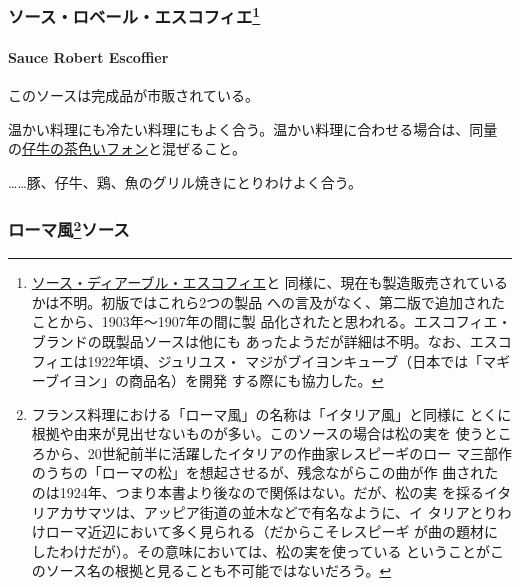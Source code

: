 \begin{recette}
{\subsubsection[ソース・ロベール・エスコフィエ]{\texorpdfstring{ソース・ロベール・エスコフィエ\footnote{\protect\hyperlink{sauce-diable-escoffier}{ソース・ディアーブル・エスコフィエ}と
  同様に、現在も製造販売されているかは不明。初版ではこれら2つの製品
  への言及がなく、第二版で追加されたことから、1903年〜1907年の間に製
  品化されたと思われる。エスコフィエ・ブランドの既製品ソースは他にも
  あったようだが詳細は不明。なお、エスコフィエは1922年頃、ジュリユス・
  マジがブイヨンキューブ（日本では「マギーブイヨン」の商品名）を開発
  する際にも協力した。}}{ソース・ロベール・エスコフィエ}}\label{ux30bdux30fcux30b9ux30edux30d9ux30fcux30ebux30a8ux30b9ux30b3ux30d5ux30a3ux30a879}}

\hypertarget{sauce-robert-escoffier}{%
\paragraph{Sauce Robert Escoffier}\label{sauce-robert-escoffier}}

 

このソースは完成品が市販されている。

温かい料理にも冷たい料理にもよく合う。温かい料理に合わせる場合は、同量
の\protect\hyperlink{fonds-de-veau-brun}{仔牛の茶色いフォン}と混ぜること。

\ldots{}\ldots{}豚、仔牛、鶏、魚のグリル焼きにとりわけよく合う。

\maeaki

\hypertarget{ux30edux30fcux30deux98a880ux30bdux30fcux30b9}{%
\subsubsection[ローマ風ソース]{\texorpdfstring{ローマ風\footnote{フランス料理における「ローマ風」の名称は「イタリア風」と同様に
  とくに根拠や由来が見出せないものが多い。このソースの場合は松の実を
  使うところから、20世紀前半に活躍したイタリアの作曲家レスピーギのロー
  マ三部作のうちの「ローマの松」を想起させるが、残念ながらこの曲が作
  曲されたのは1924年、つまり本書より後なので関係はない。だが、松の実
  を採るイタリアカサマツは、アッピア街道の並木などで有名なように、イ
  タリアとりわけローマ近辺において多く見られる（だからこそレスピーギ
  が曲の題材にしたわけだが）。その意味においては、松の実を使っている
  ということがこのソース名の根拠と見ることも不可能ではないだろう。}ソース}{ローマ風ソース}}\label{ux30edux30fcux30deux98a880ux30bdux30fcux30b9}}


\end{recette}
